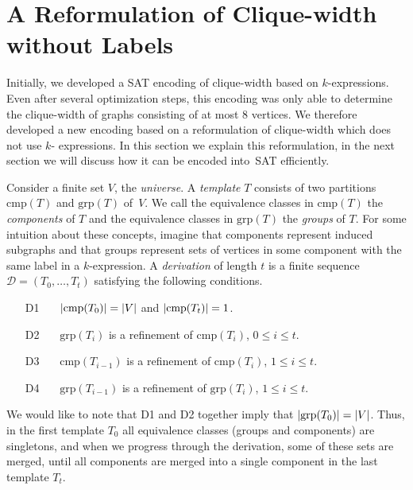 \documentclass[10pt,usletter]{article}
\theoremstyle{remark}
\newcommand{\DDD}{\mathcal{D}}
\newcommand{\hy}{\hbox{-}\nobreak\hskip0pt}
\newcommand{\comps}{\text{cmp}}
\newcommand{\groups}{\text{grp}}
\begin{document}
\section{A Reformulation of Clique-width without Labels}

Initially, we developed a SAT encoding of clique-width based on
$k$-expressions.  Even after several optimization steps, this encoding
was only able to determine the clique-width of graphs consisting of at
most 8 vertices.  We therefore developed a new encoding based on a 
reformulation of clique-width which does not use $k$\hy
expressions. In this section we explain this reformulation, in the
next section we will discuss how it can be encoded
into~SAT efficiently.



Consider a finite set $V$, the \emph{universe}.  A \emph{template} $T$
consists of two partitions $\comps(T)$ and $\groups(T)$ of~$V$. We
call the equivalence classes in $\comps(T)$ the \emph{components} of
$T$ and the equivalence classes in $\groups(T)$ the \emph{groups} of
$T$.  For some intuition about these concepts, imagine that  components represent
induced subgraphs and that groups represent sets of vertices in some component 
with the same label in a $k$-expression. A \emph{derivation} of length $t$ is a finite sequence
$\DDD=(T_0,\dots,T_t)$ satisfying the following conditions.
\begin{enumerate}
\item[D1] ~~~$\Card{\comps(T_0)}=\Card{V}$ and $\Card{\comps(T_t)}=1$.
\item[D2] ~~~$\groups(T_{i})$ is a refinement of $\comps(T_{i})$, $0\leq
  i \leq t$.
\item[D3] ~~~$\comps(T_{i-1})$ is a refinement of  $\comps(T_{i})$, $1\leq i \leq
  t$.
\item[D4] ~~~$\groups(T_{i-1})$ is a refinement of $\groups(T_{i})$, $1\leq i
  \leq t$.
\end{enumerate}
We would like to note that D1 and D2 together imply that
$\Card{\groups(T_0)}=\Card{V}$. Thus, in the first template $T_0$ all
equivalence classes (groups and components) are singletons, and when
we progress through the derivation, some of these sets are merged,
until all components are merged into a single component in the last
template $T_t$.
\end{document}
